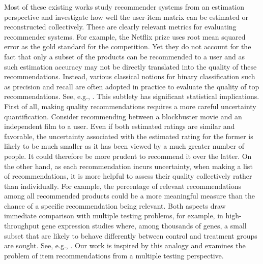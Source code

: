 \documentclass[12pt]{article}
\theoremstyle{plain}
\begin{document}
\begin{sloppypar}
Most of these existing works study recommender systems from an estimation perspective and investigate how well the user-item matrix can be estimated or reconstructed collectively. These are clearly relevant metrics for evaluating recommender systems. For example, the Netflix prize uses root mean squared error as the gold standard for the competition. Yet they do not account for the fact that only a subset of the products can be recommended to a user and as such estimation accuracy may not be directly translated into the quality of these recommendations. Instead, various classical notions for binary classification such as precision and recall are often adopted in practice to evaluate the quality of top recommendations. See, e.g., \cite{herlocker2004evaluating}. This subtlety has significant statistical implications. First of all, making quality recommendations requires a more careful uncertainty quantification. Consider recommending between a blockbuster movie and an independent film to a user. Even if both estimated ratings are similar and favorable, the uncertainty associated with the estimated rating for the former is likely to be much smaller as it has been viewed by a much greater number of people. It could therefore be more prudent to recommend it over the latter. On the other hand, as each recommendation incurs uncertainty, when making a list of recommendations, it is more helpful to assess their quality collectively rather than individually. For example, the percentage of relevant recommendations among all recommended products could be a more meaningful measure than the chance of a specific recommendation being relevant. Both aspects draw immediate comparison with multiple testing problems, for example, in high-throughput gene expression studies where, among thousands of genes, a small subset that are likely to behave differently between control and treatment groups are sought. See, e.g., \cite{storey2003statistical, efron2007correlation, efron2012large}. Our work is inspired by this analogy and examines the problem of item recommendations from a multiple testing perspective.


\end{sloppypar}
\end{document}
